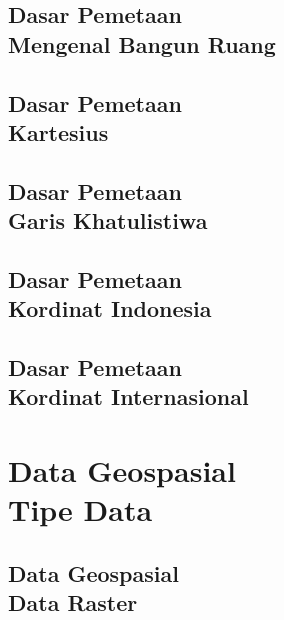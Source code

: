 \documentclass{WileySix}
\begin{document}
\chapter[Mengenal Bangun Ruang]
{Dasar Pemetaan\\ Mengenal Bangun Ruang}


\chapter[Mengenal Diagram Kartesius]
{Dasar Pemetaan\\ Kartesius}


\chapter[Garis Khatulistiwa]
{Dasar Pemetaan\\ Garis Khatulistiwa}


\chapter[Kordinat Indonesia]
{Dasar Pemetaan\\ Kordinat Indonesia}


\chapter[Kordinat Internasional]
{Dasar Pemetaan\\ Kordinat Internasional}



\part[Data Geospasial]
{Data Geospasial\\ Tipe Data}


\chapter[Data Raster]
{Data Geospasial\\ Data Raster}



%
\end{document}
